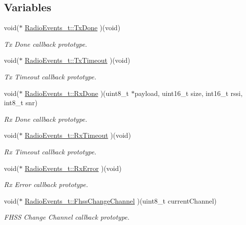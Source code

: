 \subsection*{Variables}
\begin{DoxyCompactItemize}
\item 
void($\ast$ \hyperlink{group__LORA_gafe2bdc503d6c09946dee1b800e2fb3a2}{Radio\+Events\+\_\+t\+::\+Tx\+Done} )(void)
\begin{DoxyCompactList}\small\item\em Tx Done callback prototype. \end{DoxyCompactList}\item 
void($\ast$ \hyperlink{group__LORA_ga1f435b15ceae4ce1e44af3d3c5845ffd}{Radio\+Events\+\_\+t\+::\+Tx\+Timeout} )(void)
\begin{DoxyCompactList}\small\item\em Tx Timeout callback prototype. \end{DoxyCompactList}\item 
void($\ast$ \hyperlink{group__LORA_ga92665b4b0a07eb2df1b435dcef314b48}{Radio\+Events\+\_\+t\+::\+Rx\+Done} )(uint8\+\_\+t $\ast$payload, uint16\+\_\+t size, int16\+\_\+t rssi, int8\+\_\+t snr)
\begin{DoxyCompactList}\small\item\em Rx Done callback prototype. \end{DoxyCompactList}\item 
void($\ast$ \hyperlink{group__LORA_ga1566693134c9ae4bad8a0f90ed72fff2}{Radio\+Events\+\_\+t\+::\+Rx\+Timeout} )(void)
\begin{DoxyCompactList}\small\item\em Rx Timeout callback prototype. \end{DoxyCompactList}\item 
void($\ast$ \hyperlink{group__LORA_ga17b9f56c75cbc08de07f5b2a9d234002}{Radio\+Events\+\_\+t\+::\+Rx\+Error} )(void)
\begin{DoxyCompactList}\small\item\em Rx Error callback prototype. \end{DoxyCompactList}\item 
void($\ast$ \hyperlink{group__LORA_ga1c7fd427d45e18c386c0dc10b496d74b}{Radio\+Events\+\_\+t\+::\+Fhss\+Change\+Channel} )(uint8\+\_\+t current\+Channel)
\begin{DoxyCompactList}\small\item\em F\+H\+SS Change Channel callback prototype. \end{DoxyCompactList}\item 

\end{DoxyCompactItemize}
